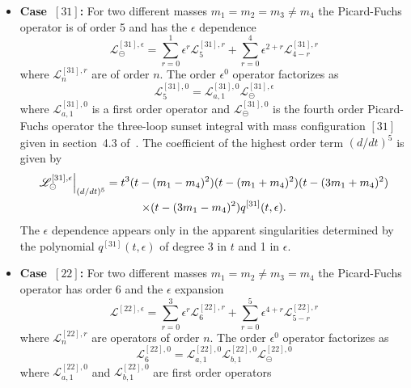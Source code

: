 \documentclass[a4paper,12pt]{article}
\numberwithin{equation}{section}
\numberwithin{figure}{subsection}
\theoremstyle{plain}
\theoremstyle{plain}
\theoremstyle{definition}
\theoremstyle{plain}
\theoremstyle{remark}
\theoremstyle{plain}
\def\su{\circleddash}
\begin{document}
\begin{itemize}
  \item   {\bf Case~$[31]$:} For two different masses $m_1=m_2=m_3 \neq m_4$ the
  Picard-Fuchs operator is of order 5 and has the $\epsilon$ dependence
  \begin{equation}
    \mathscr{L}^{[31],\epsilon}_\su=       \sum_{r=0}^1 \epsilon^r
    \mathscr{L}^{[31],r}_{5}+  \sum_{r=0}^4 \epsilon^{2+r}   \mathscr{L}^{[31],r}_{4-r}
  \end{equation}
  where  $ \mathscr{L}^{[31],r}_{n}$ are of order $n$.
  The order $\epsilon^0$ operator factorizes as
  \begin{equation}
         \mathscr{L}^{[31],0}_{5}=   \mathscr{L}^{[31],0}_{a,1} \mathscr{L}^{[31],\epsilon}_\su
       \end{equation}
        where  $ \mathscr{L}^{[31],0}_{a,1}$ is a  first order operator
       and $\mathscr{L}^{[31],0}_\su$ is the fourth order
       Picard-Fuchs operator the
       three-loop sunset integral with mass configuration $[31]$ given
       in section~4.3 of~\cite{Lairez:2022zkj}.
       The coefficient of the highest order term $(d/dt)^5$    is given by
       \begin{multline}
                   \mathscr{L}^{[31],\epsilon}_\su\Big\vert_{(d/dt)^5}=
                   t^3  (t-(m_1-m_4)^2)(t-(m_1+m_4)^2)(t-(3m_1+m_4)^2) \cr\times (t-(3m_1-m_4)^2)
            q^{[31]}(t,\epsilon)      .
                 \end{multline}
                 The $\epsilon$ dependence appears only in the
                 apparent singularities determined by the polynomial
                 $q^{[31]}(t,\epsilon)$ of degree 3 in $t$ and 1 in $\epsilon$.
\item   {\bf Case~$[22]$:} For two different masses $m_1=m_2\neq m_3 = m_4$ the
  Picard-Fuchs operator has order 6 and the $\epsilon$ expansion 
  \begin{equation}
    \mathscr{L}^{[22],\epsilon}=     \sum_{r=0}^3 \epsilon^r
    \mathscr{L}^{[22],r}_{6}+  \sum_{r=0}^5 \epsilon^{4+r}   \mathscr{L}^{[22],r}_{5-r}
  \end{equation}
  where  $ \mathscr{L}^{[22],r}_{n}$ are 
  operators of order $n$.
  The order $\epsilon^0$ operator factorizes as
  \begin{equation}
         \mathscr{L}^{[22],0}_{6}=   \mathscr{L}^{[22],0}_{a,1} \mathscr{L}^{[22],0}_{b,1}\mathscr{L}^{[22],0}_\su
       \end{equation}
       where  $ \mathscr{L}^{[22],0}_{a,1}$ and $
       \mathscr{L}^{[22],0}_{b,1}$ are first order operators

\end{itemize}
\end{document}

